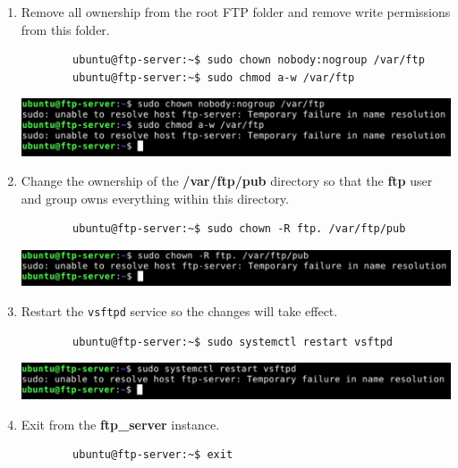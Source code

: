 \documentclass[letterpaper, 12pt]{article}
\begin{document}
\begin{enumerate}
    \item Remove all ownership from the root FTP folder and remove write permissions from this folder.
    \begin{lstlisting}
        ubuntu@ftp-server:~$ sudo chown nobody:nogroup /var/ftp
        ubuntu@ftp-server:~$ sudo chmod a-w /var/ftp
    \end{lstlisting}

    \begin{center}
        \includegraphics[width=\linewidth]{images/part1/step46.png}
    \end{center}

    \item Change the ownership of the \textbf{/var/ftp/pub} directory so that the \textbf{ftp} user and group owns
    everything within this directory.
    \begin{lstlisting}
        ubuntu@ftp-server:~$ sudo chown -R ftp. /var/ftp/pub
    \end{lstlisting}

    \begin{center}
        \includegraphics[width=\linewidth]{images/part1/step47.png}
    \end{center}

    \item Restart the \texttt{vsftpd} service so the changes will take effect.
    \begin{lstlisting}
        ubuntu@ftp-server:~$ sudo systemctl restart vsftpd
    \end{lstlisting}

    \begin{center}
        \includegraphics[width=\linewidth]{images/part1/step48.png}
    \end{center}

    \item Exit from the \textbf{ftp\_server} instance.
    \begin{lstlisting}
        ubuntu@ftp-server:~$ exit
    \end{lstlisting}


\end{enumerate}
\end{document}

